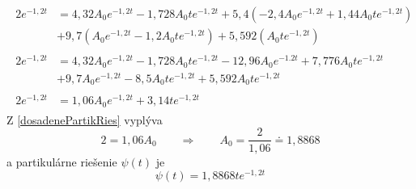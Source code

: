 \documentclass[a4paper, 10pt, ]{article}
\begin{document}
\begin{subequations}
\begin{align}
	\begin{split}
		2 e^{-1,2t} &=
		 4,32 A_0 e^{-1,2t} - 1,728 A_0 t e^{-1,2t}  + 5,4 \left( -2,4 A_0 e^{-1,2t} + 1,44 A_0 t e^{-1,2t} \right) \\
		& + 9,7  \left( A_0 e^{-1,2t} - 1,2 A_0 t e^{-1,2t} \right) + 5,592 \left( A_0 t e^{-1,2 t} \right)
	\end{split} \\
	\begin{split}
		2 e^{-1,2t} &=
		 4,32 A_0 e^{-1,2t} - 1,728 A_0 t e^{-1,2t} - 12,96 A_0 e^{-1.2t} + 7,776 A_0 t e^{-1,2t}  \\
		& + 9,7  A_0 e^{-1,2t} - 8,5 A_0 t e^{-1,2t} + 5,592  A_0 t e^{-1,2 t}
	\end{split} \\
	\begin{split} \label{dosadenePartikRies}
		2 e^{-1,2t} &=
		 1,06 A_0 e^{-1,2t} + 3,14 t e^{-1,2 t}
	\end{split}
\end{align}
\end{subequations}
Z \eqref{dosadenePartikRies} vyplýva
\begin{equation}
	2 = 1,06 A_0 \qquad \Rightarrow \qquad A_0 = \frac{2}{1,06} \doteq 1,8868
\end{equation}
a partikulárne riešenie $\psi(t)$ je
\begin{equation} \label{Partikulárne riešenie}
	\psi(t) = 1,8868 t e^{-1,2 t}
\end{equation}
\end{document}

